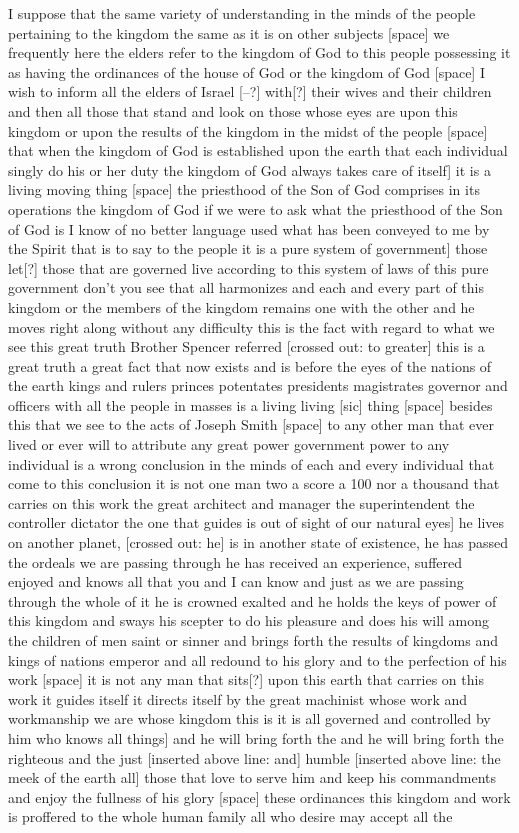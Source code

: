 					I suppose that the same variety of understanding in the minds of the people pertaining to the kingdom the same as it is on other subjects [space] we frequently here the elders refer to the kingdom of God to this people possessing it as having the ordinances of the house of God or the kingdom of God [space] I wish to inform all the elders of Israel [--?] with[?] their wives and their children and then all those that stand and look on those whose eyes are upon this kingdom or upon the results of the kingdom in the midst of the people [space] that when the kingdom of God is established upon the earth that each individual singly do his or her duty the kingdom of God always takes care of itself] it is a living moving thing [space] the priesthood of the Son of God comprises in its operations the kingdom of God if we were to ask what the priesthood of the Son of God is I know of no better language used what has been conveyed to me by the Spirit that is to say to the people it is a pure system of government] those let[?] those that are governed live according to this system of laws of this pure government don't you see that all harmonizes and each and every part of this kingdom or the members of the kingdom remains one with the other and he moves right along without any difficulty this is the fact with regard to what we see this great truth Brother Spencer referred [crossed out: to greater] this is a great truth a great fact that now exists and is before the eyes of the nations of the earth kings and rulers princes potentates presidents magistrates governor and officers with all the people in masses is a living living [sic] thing [space] besides this that we see to the acts of Joseph Smith [space] to any other man that ever lived or ever will to attribute any great power government power to any individual is a wrong conclusion in the minds of each and every individual that come to this conclusion it is not one man two a score a 100 nor a thousand that carries on this work the great architect and manager the superintendent the controller dictator the one that guides is out of sight of our natural eyes] he lives on another planet, [crossed out: he] is in another state of existence, he has passed the ordeals we are passing through he has received an experience, suffered enjoyed and knows all that you and I can know and just as we are passing through the whole of it he is crowned exalted and he holds the keys of power of this kingdom and sways his scepter to do his pleasure and does his will among the children of men saint or sinner and brings forth the results of kingdoms and kings of nations emperor and all redound to his glory and to the perfection of his work [space] it is not any man that sits[?] upon this earth that carries on this work it guides itself it directs itself by the great machinist whose work and workmanship we are whose kingdom this is it is all governed and controlled by him who knows all things] and he will bring forth the and he will bring forth the righteous and the just [inserted above line: and] humble [inserted above line: the meek of the earth all] those that love to serve him and keep his commandments and enjoy the fullness of his glory [space] these ordinances this kingdom and work is proffered to the whole human family all who desire may accept all the 